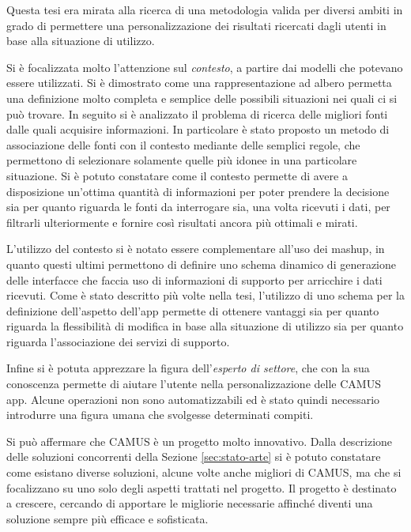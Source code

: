 Questa tesi era mirata alla ricerca di una metodologia valida per diversi ambiti in grado di permettere una personalizzazione dei risultati ricercati dagli utenti in base alla situazione di utilizzo.

Si è focalizzata molto l'attenzione sul \emph{contesto}, a partire dai modelli che potevano essere utilizzati. Si è dimostrato come una rappresentazione ad albero permetta una definizione molto completa e semplice delle possibili situazioni nei quali ci si può trovare. In seguito si è analizzato il problema di ricerca delle migliori fonti dalle quali acquisire informazioni. In particolare è stato proposto un metodo di associazione delle fonti con il contesto mediante delle semplici regole, che permettono di selezionare solamente quelle più idonee in una particolare situazione. Si è potuto constatare come il contesto permette di avere a disposizione un'ottima quantità di informazioni per poter prendere la decisione sia per quanto riguarda le fonti da interrogare sia, una volta ricevuti i dati, per filtrarli ulteriormente e fornire così risultati ancora più ottimali e mirati.

L'utilizzo del contesto si è notato essere complementare all'uso dei mashup, in quanto questi ultimi permettono di definire uno schema dinamico di generazione delle interfacce che faccia uso di informazioni di supporto per arricchire i dati ricevuti. Come è stato descritto più volte nella tesi, l'utilizzo di uno schema per la definizione dell'aspetto dell'app permette di ottenere vantaggi sia per quanto riguarda la flessibilità di modifica in base alla situazione di utilizzo sia per quanto riguarda l'associazione dei servizi di supporto.

Infine si è potuta apprezzare la figura dell'\emph{esperto di settore}, che con la sua conoscenza permette di aiutare l'utente nella personalizzazione delle CAMUS app. Alcune operazioni non sono automatizzabili ed è stato quindi necessario introdurre una figura umana che svolgesse determinati compiti.

Si può affermare che CAMUS è un progetto molto innovativo. Dalla descrizione delle soluzioni concorrenti della Sezione \ref{sec:stato-arte} si è potuto constatare come esistano diverse soluzioni, alcune volte anche migliori di CAMUS, ma che si focalizzano su uno solo degli aspetti trattati nel progetto. Il progetto è destinato a crescere, cercando di apportare le migliorie necessarie affinché diventi una soluzione sempre più efficace e sofisticata.

